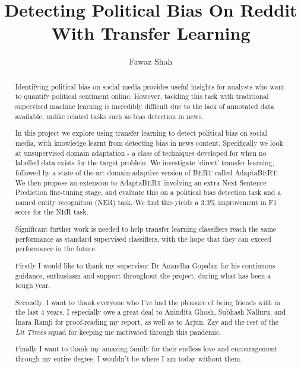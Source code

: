 \documentclass[a4paper, twoside]{report}
\title{Detecting Political Bias On Reddit With Transfer Learning}
\author{Fawaz Shah}
\begin{document}


\begin{abstract}

Identifying political bias on social media provides useful insights for analysts who want to quantify political sentiment online. However, tackling this task with traditional supervised machine learning is incredibly difficult due to the lack of annotated data available, unlike related tasks such as bias detection in news.

In this project we explore using transfer learning to detect political bias on social media, with knowledge learnt from detecting bias in news content. Specifically we look at unsupervised domain adaptation - a class of techniques developed for when no labelled data exists for the target problem. We investigate `direct' transfer learning, followed by a state-of-the-art domain-adaptive version of BERT called AdaptaBERT. We then propose an extension to AdaptaBERT involving an extra Next Sentence Prediction fine-tuning stage, and evaluate this on a political bias detection task and a named entity recognition (NER) task. We find this yields a 3.3\% improvement in F1 score for the NER task.

Significant further work is needed to help transfer learning classifiers reach the same performance as standard supervised classifiers, with the hope that they can exceed performance in the future.

\end{abstract}

\renewcommand{\abstractname}{Acknowledgements}
\begin{abstract}

Firstly I would like to thank my supervisor Dr Anandha Gopalan for his continuous guidance, enthusiasm and support throughout the project, during what has been a tough year.

Secondly, I want to thank everyone who I've had the pleasure of being friends with in the last 4 years. I especially owe a great deal to Anindita Ghosh, Subhash Nalluru, and Inara Ramji for proof-reading my report, as well as to Arjun, Zay and the rest of the \textit{Lit Times} squad for keeping me motivated through this pandemic.

Finally I want to thank my amazing family for their endless love and encouragement through my entire degree. I wouldn't be where I am today without them.

\end{abstract}

\tableofcontents
\listoffigures
\listoftables









\end{document}
